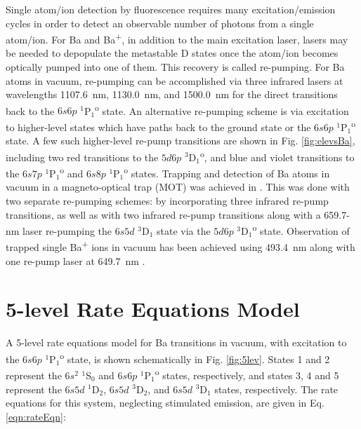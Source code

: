 Single atom/ion detection by fluorescence requires many excitation/emission cycles in order to detect an observable number of photons from a single atom/ion.  For Ba and Ba\textsuperscript{+}, in addition to the main excitation laser, lasers may be needed to depopulate the metastable D states once the atom/ion becomes optically pumped into one of them.  This recovery is called re-pumping.  For Ba atoms in vacuum, re-pumping can be accomplished via three infrared lasers at wavelengths 1107.6~nm, 1130.0~nm, and 1500.0~nm for the direct transitions back to the $6s6p$ $^{1}$P$_{1}$\textsuperscript{o} state.  An alternative re-pumping scheme is via excitation to higher-level states which have paths back to the ground state or the $6s6p$ $^{1}$P$_{1}$\textsuperscript{o} state.  A few such higher-level re-pump transitions are shown in Fig. \ref{fig:elevsBa}, including two red transitions to the $5d6p$ $^{3}$D$_{1}$\textsuperscript{o}, and blue and violet transitions to the $6s7p$ $^{1}$P$_{1}$\textsuperscript{o} and $6s8p$ $^{1}$P$_{1}$\textsuperscript{o} states.  Trapping and detection of Ba atoms in vacuum in a magneto-optical trap (MOT) was achieved in \cite{BaMOT}.  This was done with two separate re-pumping schemes:  by incorporating three infrared re-pump transitions, as well as with two infrared re-pump transitions along with a 659.7-nm laser re-pumping the $6s5d$ $^{3}$D$_{1}$ state via the $5d6p$ $^{3}$D$_{1}$\textsuperscript{o} state.  Observation of trapped single Ba\textsuperscript{+} ions in vacuum has been achieved using 493.4~nm along with one re-pump laser at 649.7~nm \cite{BaPlus1978,singleBaPlusEXO}.


\section{5-level Rate Equations Model}
\label{sec:model}

A 5-level rate equations model for Ba transitions in vacuum, with excitation to the $6s6p$ $^{1}$P$_{1}$\textsuperscript{o} state, is shown schematically in Fig. \ref{fig:5lev}.  States 1 and 2 represent the $6s^{2}$ $^{1}$S$_{0}$ and $6s6p$ $^{1}$P$_{1}$\textsuperscript{o} states, respectively, and states 3, 4 and 5 represent the $6s5d$ $^{1}$D$_{2}$, $6s5d$ $^{3}$D$_{2}$, and $6s5d$ $^{3}$D$_{1}$ states, respectively.  The rate equations for this system, neglecting stimulated emission, are given in Eq. \ref{eqn:rateEqn}:


